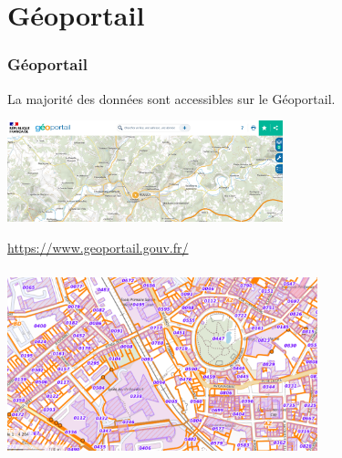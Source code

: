 \documentclass[svgnames,11pt]{beamer}
\begin{document}
\section{Géoportail}
\begin{frame}
    \frametitle{Géoportail}

La majorité des données sont accessibles sur le Géoportail.
\begin{center}
\centering
\includegraphics[width=8cm]{ressources/geoportail.png}
\label{IMG}
\end{center}
\begin{center}
    {\Large \url{https://www.geoportail.gouv.fr/}}
\end{center}
\end{frame}
\begin{frame}
    \frametitle{}

\begin{center}
\centering
\includegraphics[width=9cm]{ressources/cadastre.png}
\label{IMG}
\end{center}

\end{frame}
\end{document}
